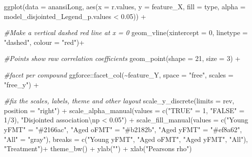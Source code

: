 \documentclass[
]{article}
\newenvironment{Shaded}{\begin{snugshade}}{\end{snugshade}}
\newcommand{\AttributeTok}[1]{\textcolor[rgb]{0.77,0.63,0.00}{#1}}
\newcommand{\CommentTok}[1]{\textcolor[rgb]{0.56,0.35,0.01}{\textit{#1}}}
\newcommand{\DecValTok}[1]{\textcolor[rgb]{0.00,0.00,0.81}{#1}}
\newcommand{\FloatTok}[1]{\textcolor[rgb]{0.00,0.00,0.81}{#1}}
\newcommand{\FunctionTok}[1]{\textcolor[rgb]{0.00,0.00,0.00}{#1}}
\newcommand{\NormalTok}[1]{#1}
\newcommand{\OtherTok}[1]{\textcolor[rgb]{0.56,0.35,0.01}{#1}}
\newcommand{\SpecialCharTok}[1]{\textcolor[rgb]{0.00,0.00,0.00}{#1}}
\newcommand{\StringTok}[1]{\textcolor[rgb]{0.31,0.60,0.02}{#1}}
\begin{document}
\begin{Shaded}
\begin{Highlighting}[]
\FunctionTok{ggplot}\NormalTok{(}\AttributeTok{data =}\NormalTok{ anansiLong, }
       \FunctionTok{aes}\NormalTok{(}\AttributeTok{x      =}\NormalTok{ r.values, }
           \AttributeTok{y      =}\NormalTok{ feature\_X, }
           \AttributeTok{fill   =}\NormalTok{ type, }
           \AttributeTok{alpha  =}\NormalTok{ model\_disjointed\_Legend\_p.values }\SpecialCharTok{\textless{}} \FloatTok{0.05}\NormalTok{)) }\SpecialCharTok{+} 
  
  \CommentTok{\#Make a vertical dashed red line at x = 0}
  \FunctionTok{geom\_vline}\NormalTok{(}\AttributeTok{xintercept =} \DecValTok{0}\NormalTok{, }\AttributeTok{linetype =} \StringTok{"dashed"}\NormalTok{, }\AttributeTok{colour =} \StringTok{"red"}\NormalTok{)}\SpecialCharTok{+}
  
  \CommentTok{\#Points show  raw correlation coefficients}
  \FunctionTok{geom\_point}\NormalTok{(}\AttributeTok{shape =} \DecValTok{21}\NormalTok{, }\AttributeTok{size =} \DecValTok{3}\NormalTok{) }\SpecialCharTok{+} 
  
  \CommentTok{\#facet per compound}
\NormalTok{  ggforce}\SpecialCharTok{::}\FunctionTok{facet\_col}\NormalTok{(}\SpecialCharTok{\textasciitilde{}}\NormalTok{feature\_Y, }\AttributeTok{space =} \StringTok{"free"}\NormalTok{, }\AttributeTok{scales =} \StringTok{"free\_y"}\NormalTok{) }\SpecialCharTok{+} 
  
  \CommentTok{\#fix the scales, labels, theme and other layout}
  \FunctionTok{scale\_y\_discrete}\NormalTok{(}\AttributeTok{limits =}\NormalTok{ rev, }\AttributeTok{position =} \StringTok{"right"}\NormalTok{) }\SpecialCharTok{+}
  \FunctionTok{scale\_alpha\_manual}\NormalTok{(}\AttributeTok{values =} \FunctionTok{c}\NormalTok{(}\StringTok{"TRUE"} \OtherTok{=} \DecValTok{1}\NormalTok{, }
                                \StringTok{"FALSE"} \OtherTok{=} \DecValTok{1}\SpecialCharTok{/}\DecValTok{3}\NormalTok{), }\StringTok{"Disjointed association}\SpecialCharTok{\textbackslash{}n}\StringTok{p \textless{} 0.05"}\NormalTok{) }\SpecialCharTok{+}
  \FunctionTok{scale\_fill\_manual}\NormalTok{(}\AttributeTok{values =} \FunctionTok{c}\NormalTok{(}\StringTok{"Young yFMT"} \OtherTok{=} \StringTok{"\#2166ac"}\NormalTok{, }
                               \StringTok{"Aged oFMT"}  \OtherTok{=} \StringTok{"\#b2182b"}\NormalTok{, }
                               \StringTok{"Aged yFMT"}  \OtherTok{=} \StringTok{"\#ef8a62"}\NormalTok{, }
                               \StringTok{"All"}        \OtherTok{=} \StringTok{"gray"}\NormalTok{), }
                    \AttributeTok{breaks =} \FunctionTok{c}\NormalTok{(}\StringTok{"Young yFMT"}\NormalTok{, }\StringTok{"Aged oFMT"}\NormalTok{, }\StringTok{"Aged yFMT"}\NormalTok{, }\StringTok{"All"}\NormalTok{), }
                    \StringTok{"Treatment"}\NormalTok{)}\SpecialCharTok{+}
  \FunctionTok{theme\_bw}\NormalTok{() }\SpecialCharTok{+} 
  \FunctionTok{ylab}\NormalTok{(}\StringTok{""}\NormalTok{) }\SpecialCharTok{+} 
  \FunctionTok{xlab}\NormalTok{(}\StringTok{"Pearson\textquotesingle{}s rho"}\NormalTok{)}
\end{Highlighting}
\end{Shaded}
\end{document}
